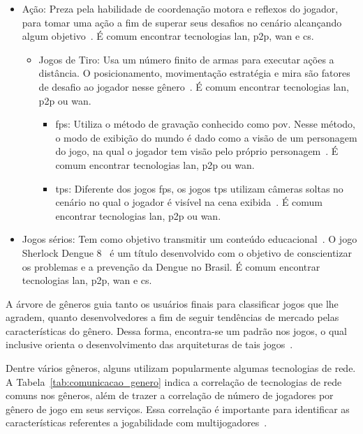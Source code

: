 \begin{itemize}
\begin{itemize}
    \end{itemize}
  \item Ação: Preza pela habilidade de coordenação motora e reflexos do jogador, para tomar uma ação a fim de superar seus desafios no cenário alcançando algum objetivo~\cite{adams_1208533}. É comum encontrar tecnologias \ac{lan}, \ac{p2p}, \ac{wan} e \ac{cs}.
    \begin{itemize}
      \item Jogos de Tiro: Usa um número finito de armas para executar ações a distância. O posicionamento, movimentação estratégia e mira são fatores de desafio ao jogador nesse gênero~\cite{adams_1208533}. É comum encontrar tecnologias \ac{lan}, \ac{p2p} ou \ac{wan}.
        \begin{itemize}
          \item \ac{fps}: Utiliza o método de gravação conhecido como \ac{pov}. Nesse método, o modo de exibição do mundo é dado como a visão de um personagem do jogo, na qual o jogador tem visão pelo próprio personagem~\cite{video_game_technologies, adams_1208533}. É comum encontrar tecnologias \ac{lan}, \ac{p2p} ou \ac{wan}.
          \item \ac{tps}: Diferente dos jogos \ac{fps}, os jogos \ac{tps} utilizam câmeras soltas no cenário no qual o jogador é visível na cena exibida~\cite{video_game_technologies, adams_1208533}. É comum encontrar tecnologias \ac{lan}, \ac{p2p} ou \ac{wan}.
        \end{itemize}
    \end{itemize}
  \item Jogos sérios: Tem como objetivo transmitir um conteúdo educacional~\cite{video_game_technologies}. O jogo Sherlock Dengue 8~\cite{sherlock_dengue} é um título desenvolvido com o objetivo de conscientizar os problemas e a prevenção da Dengue no Brasil. É comum encontrar tecnologias \ac{lan}, \ac{p2p}, \ac{wan} e \ac{cs}.
\end{itemize}

A árvore de gêneros guia tanto os usuários finais para classificar jogos que lhe agradem, quanto desenvolvedores a fim de seguir tendências de mercado pelas características do gênero.
%
Dessa forma, encontra-se um padrão nos jogos, o qual inclusive orienta o desenvolvimento das arquiteturas de tais jogos~\cite{video_game_technologies}.

Dentre vários gêneros, alguns utilizam popularmente algumas tecnologias de rede.
%
A Tabela~\ref{tab:comunicacao_genero} indica a correlação de tecnologias de rede comuns nos gêneros, além de trazer a correlação de número de jogadores por gênero de jogo em seus serviços.
%
Essa correlação é importante para identificar as características referentes a jogabilidade com multijogadores~\cite{video_game_technologies}.


